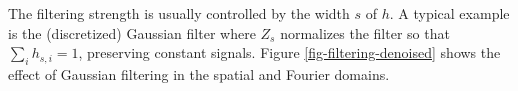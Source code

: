 The filtering strength is usually controlled by the width $s$ of $h$. A typical example is the (discretized) Gaussian filter
where $Z_s$ normalizes the filter so that $\sum_i h_{s,i}=1$, preserving constant signals. Figure \ref{fig-filtering-denoised} shows the effect of Gaussian filtering in the spatial and Fourier domains.

     